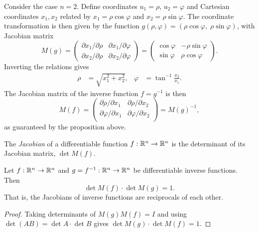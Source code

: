 \documentclass[a4paper]{article}
\begin{document}
\begin{eg}
  Consider the case $n = 2$. Define coordinates $u_1 = \rho$, $u_2 = \varphi$ and Cartesian coordinates $x_1, x_2$ related by $x_1 = \rho \cos \varphi$ and $x_2 = \rho \sin \varphi$. The coordinate transformation is then given by the function $g(\rho, \varphi) = (\rho\cos \varphi,\; \rho\sin \varphi)$, with Jacobian matrix
  \[
    M(g) =
    \begin{pmatrix}
      \partial x_1/\partial \rho & \partial x_1/\partial \varphi\\
      \partial x_2/\partial \rho & \partial x_2/\partial \varphi
    \end{pmatrix}
    =
    \begin{pmatrix}
      \cos\varphi & -\rho\sin \varphi\\
      \sin \varphi & \rho \cos \varphi
    \end{pmatrix}.
  \]
  Inverting the relations gives
  \begin{align*}
    \rho &= \sqrt{x_1^2 + x_2^2}, &
    \varphi &= \tan^{-1} \frac{x_2}{x_1}.
  \end{align*}
  The Jacobian matrix of the inverse function $f = g^{-1}$ is then
  \[
    M(f) =
    \begin{pmatrix}
      \partial\rho/\partial x_1 & \partial\rho/\partial x_2\\
      \partial\varphi/\partial x_1 & \partial\varphi/\partial x_2\\
    \end{pmatrix}
    = M(g)^{-1},
  \]
  as guaranteed by the proposition above.
\end{eg}

\begin{defi}[Jacobian]
  The \emph{Jacobian} of a differentiable function $f: \mathbb{R}^n \to \mathbb{R}^n$ is the determinant of its Jacobian matrix, $\det M(f)$.
\end{defi}

\begin{cor}
  Let $f: \mathbb{R}^n \to \mathbb{R}^n$ and $g = f^{-1}: \mathbb{R}^n \to \mathbb{R}^n$ be differentiable inverse functions. Then
  \[
    \det M(f) \cdot \det M(g) = 1.
  \]
  That is, the Jacobians of inverse functions are reciprocals of each other.
\end{cor}

\begin{proof}
  Taking determinants of $M(g) M(f) = I$ and using $\det(AB) = \det A \cdot \det B$ gives $\det M(g) \cdot \det M(f) = 1$.
\end{proof}
\end{document}
